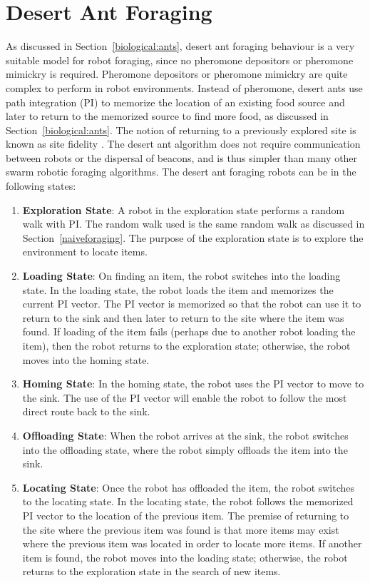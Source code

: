 \section{Desert Ant Foraging}
\label{desertantforaging}


As discussed in Section~\ref{biological:ants}, desert ant foraging behaviour is a very suitable model for robot foraging, since no pheromone depositors or pheromone mimickry is required. Pheromone depositors or pheromone mimickry are quite complex to perform in robot environments. Instead of pheromone, desert ants use path integration (PI) to memorize the location of an existing food source and later to return to the memorized source to find more food, as discussed in Section~\ref{biological:ants}. The notion of returning to a previously explored site is known as site fidelity \cite{switzer1993site}. The desert ant algorithm does not require communication between robots or the dispersal of beacons, and is thus simpler than many other swarm robotic foraging algorithms. The desert ant foraging robots can be in the following states:

\begin{enumerate}
	\item\textbf{Exploration State}: A robot in the exploration state performs a random walk with PI. The random walk used is the same random walk as discussed in Section~\ref{naiveforaging}. The purpose of the exploration state is to explore the environment to locate items. 
	\item\textbf{Loading State}: On finding an item, the robot switches into the loading state. In the loading state, the robot loads the item and memorizes the current PI vector. The PI vector is memorized so that the robot can use it to return to the sink and then later to return to the site where the item was found. If loading of the item fails (perhaps due to another robot loading the item), then the robot returns to the exploration state; otherwise, the robot moves into the homing state.
	\item\textbf{Homing State}: In the homing state, the robot uses the PI vector to move to the sink. The use of the PI vector will enable the robot to follow the most direct route back to the sink.
	\item\textbf{Offloading State}: When the robot arrives at the sink, the robot switches into the offloading state, where the robot simply offloads the item into the sink. 
	\item\textbf{Locating State}: Once the robot has offloaded the item, the robot switches to the locating state. In the locating state, the robot follows the memorized PI vector to the location of the previous item. The premise of returning to the site where the previous item was found is that more items may exist where the previous item was located in order to locate more items. If another item is found, the robot moves into the loading state; otherwise, the robot returns to the exploration state in the search of new items. 
\end{enumerate}

